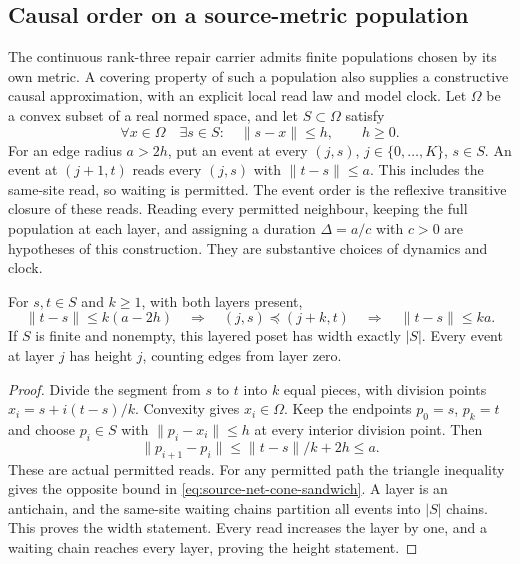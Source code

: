 \subsection{Causal order on a source-metric population}
\label{sec:source-net-causal-limit}

The continuous rank-three repair carrier admits finite populations chosen
by its own metric. A covering property of such a population also supplies a
constructive causal approximation, with an explicit local read law and
model clock. Let $\Omega$ be a convex subset of a real normed space, and let
$S\subset\Omega$ satisfy
\[
 \forall x\in\Omega\quad\exists s\in S:\quad\|s-x\|\leq h,
 \qquad h\geq0.
\]
For an edge radius $a>2h$, put an event at every $(j,s)$,
$j\in\{0,\ldots,K\}$, $s\in S$. An event at $(j+1,t)$ reads every
$(j,s)$ with $\|t-s\|\leq a$. This includes the same-site read, so waiting
is permitted. The event order is the reflexive transitive closure of these
reads. Reading every permitted neighbour, keeping the full population at
each layer, and assigning a duration $\Delta=a/c$ with $c>0$ are hypotheses
of this construction. They are substantive choices of dynamics and clock.

\begin{proposition}
\label{prop:source-net-causal-path}
For $s,t\in S$ and $k\geq1$, with both layers present,
\begin{equation}
 \|t-s\|\leq k(a-2h)
 \quad\Longrightarrow\quad
 (j,s)\preceq(j+k,t)
 \quad\Longrightarrow\quad
 \|t-s\|\leq ka.
 \label{eq:source-net-cone-sandwich}
\end{equation}
If $S$ is finite and nonempty, this layered poset has width exactly $|S|$.
Every event at layer $j$ has height $j$, counting edges from layer zero.
\end{proposition}
\begin{proof}
Divide the segment from $s$ to $t$ into $k$ equal pieces, with division
points $x_i=s+i(t-s)/k$. Convexity gives $x_i\in\Omega$. Keep the endpoints
$p_0=s$, $p_k=t$ and choose $p_i\in S$ with $\|p_i-x_i\|\leq h$ at every
interior division point. Then
\[
 \|p_{i+1}-p_i\|
 \leq \|t-s\|/k+2h\leq a.
\]
These are actual permitted reads. For any permitted path the triangle
inequality gives the opposite bound in
\eqref{eq:source-net-cone-sandwich}. A layer is an antichain, and the
same-site waiting chains partition all events into $|S|$ chains. This proves
the width statement. Every read increases the layer by one, and a waiting
chain reaches every layer, proving the height statement.
\end{proof}

